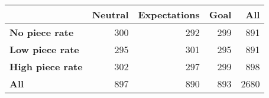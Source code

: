 \begin{tabular}{lrrrr}
\toprule
{} &  Neutral &  Expectations &  Goal &   All \\
\midrule
\textbf{No piece rate  } &      300 &           292 &   299 &   891 \\
\textbf{Low piece rate } &      295 &           301 &   295 &   891 \\
\textbf{High piece rate} &      302 &           297 &   299 &   898 \\
\textbf{All            } &      897 &           890 &   893 &  2680 \\
\bottomrule
\end{tabular}
